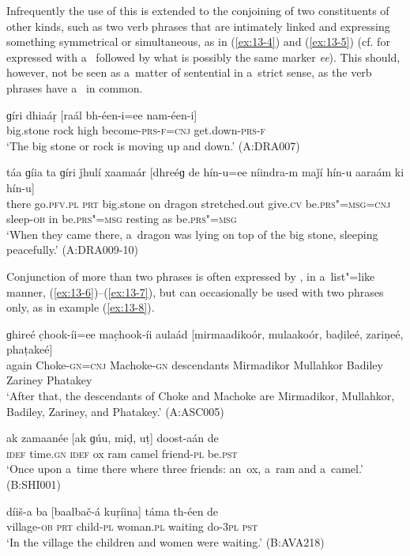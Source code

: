 Infrequently the use of this  is extended to the conjoining of two constituents of other kinds, such as two verb phrases that are intimately linked and expressing something symmetrical or simultaneous, as in (\ref{ex:13-4}) and (\ref{ex:13-5}) (cf.  for  expressed with a~ followed by what is possibly the same marker \textit{ee}). This should, however, not be seen as a~matter of sentential  in a~strict sense, as the verb phrases have a~ in common.

\begin{exe}
\ex
\label{ex:13-4}
\gll ɡíri dhiaáṛ [raál bh-éen-i=ee nam-éen-i]  \\
big.stone rock high become-\textsc{prs-f=cnj} get.down-\textsc{prs-f}  \\
\glt `The big stone or rock is moving up and down.' (A:DRA007)

\ex
\label{ex:13-5}
\gll táa ɡíia ta ɡíri ǰhulí xaamaár [dhreéɡ de hín-u=ee níindra-m maǰí hín-u aaraám ki hín-u] \\
there go.\textsc{pfv.pl} \textsc{prt} big.stone on dragon stretched.out  give.\textsc{cv} be.\textsc{prs"=msg=cnj} sleep-\textsc{ob} in be.\textsc{prs"=msg}  resting as be.\textsc{prs"=msg}  \\
\glt `When they came there, a~dragon was lying on top of the big stone, sleeping peacefully.' (A:DRA009-10) 
\end{exe}

 Conjunction of more than two  phrases is often expressed by , in a~list"=like manner, (\ref{ex:13-6})--(\ref{ex:13-7}), but can occasionally be used with two  phrases only, as in example (\ref{ex:13-8}).

\begin{exe}
\ex
\label{ex:13-6}
\gll ɡhireé c̣hook-íi=ee mac̣hook-íi aulaád [mirmaadikoór, mulaakoór, baḍileé, zariṇeé, phaṭakeé] \\
again Choke-\textsc{gn=cnj} Machoke-\textsc{gn} descendants  Mirmadikor Mullahkor Badiley Zariney Phatakey \\
\glt `After that, the descendants of Choke and Machoke are Mirmadikor, Mullahkor, Badiley, Zariney, and Phatakey.' (A:ASC005)

\ex
\label{ex:13-7}
\gll ak zamaanée [ak ɡúu, miḍ, uṭ] doost-aán de \\
\textsc{idef} time.\textsc{gn} \textsc{ idef} ox ram camel friend-\textsc{pl}  be.\textsc{pst}  \\
\glt `Once upon a~time there where three friends: an~ox, a~ram and a~camel.' (B:SHI001)

\ex
\label{ex:13-8}
\gll díiš-a ba [baalbač-á kuṛíina] táma th-éen de \\
village-\textsc{ob} \textsc{prt} child-\textsc{pl} woman.\textsc{pl} waiting do-\textsc{3pl} \textsc{pst}  \\
\glt `In the village the children and women were waiting.' (B:AVA218) 
\end{exe}

